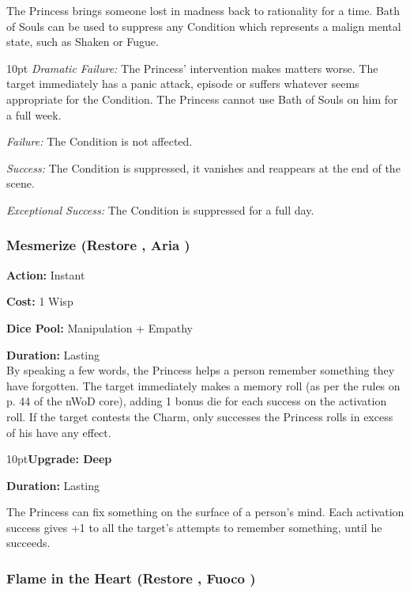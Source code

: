 \noindent The Princess brings someone lost in madness back to rationality for a time. Bath of Souls can be used to suppress any Condition which represents a malign mental state, such as Shaken or Fugue. 

\begin{myindentpar}{10pt}    \emph{Dramatic Failure:} The Princess' intervention makes matters worse. The target immediately has a panic attack, episode or suffers whatever seems appropriate for the Condition. The Princess cannot use Bath of Souls on him for a full week.

    \emph{Failure:} The Condition is not affected.

    \emph{Success:} The Condition is suppressed, it vanishes and reappears at the end of the scene.

    \emph{Exceptional Success:} The Condition is suppressed for a full day.

    \end{myindentpar}
	
\subsubsection*{Mesmerize (Restore \textbullet\textbullet, Aria \textbullet)}

\noindent \textbf{Action:} Instant

\noindent \textbf{Cost:} 1 Wisp

\noindent \textbf{Dice Pool:} Manipulation + Empathy

\noindent \textbf{Duration:} Lasting \\

\noindent By speaking a few words, the Princess helps a person remember something they have forgotten. The target immediately makes a memory roll (as per the rules on p. 44 of the nWoD core), adding 1 bonus die for each success on the activation roll. If the target contests the Charm, only successes the Princess rolls in excess of his have any effect.
\begin{myindentpar}{10pt}\textbf{Upgrade: Deep}

\noindent \textbf{Duration:} Lasting

The Princess can fix something on the surface of a person's mind. Each activation success gives +1 to all the target's attempts to remember something, until he succeeds.\end{myindentpar}

\subsubsection*{Flame in the Heart (Restore \textbullet\textbullet, Fuoco \textbullet)}

